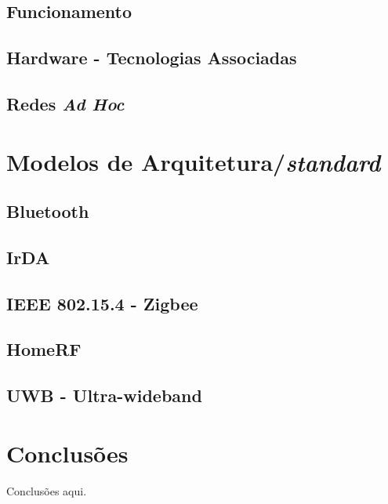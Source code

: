 \documentclass[conference]{IEEEtran}
\begin{document}
\subsection{Funcionamento}

\subsection{Hardware - Tecnologias Associadas}

\subsection{Redes \textit{Ad Hoc}}
\label{redes_ad_hoc}


\section{Modelos de Arquitetura/\textit{standard}}

\subsection{Bluetooth}

\subsection{IrDA}

\subsection{IEEE 802.15.4 - Zigbee}

\subsection{HomeRF}

\subsection{UWB - Ultra-wideband}





\section{Conclusões}
Conclusões aqui.

{}

\end{document}
